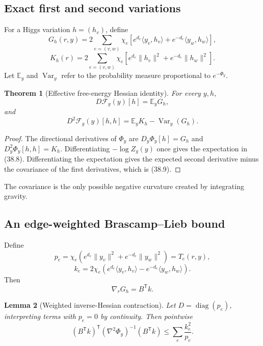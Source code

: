 \documentclass[11pt]{article}
\newtheorem{theorem}{Theorem}[section]
\newtheorem{lemma}[theorem]{Lemma}
\theoremstyle{remark}
\begin{document}
\subsection{Exact first and second variations}

For a Higgs variation \(h=(h_v)\), define
\[
 G_h(r,y)=2\sum_{e=(v,w)}\chi_e\left[
 e^{d_e}\langle y_v,h_v\rangle
 +e^{-d_e}\langle y_w,h_w\rangle
 \right],                                         \tag{38.6}
\]
\[
 K_h(r)=2\sum_{e=(v,w)}\chi_e\left[
 e^{d_e}\|h_v\|^2+e^{-d_e}\|h_w\|^2
 \right].                                         \tag{38.7}
\]
Let \(\mathbb E_y\) and \(\operatorname{Var}_y\) refer to the
probability measure proportional to \(e^{-\Phi_y}\).

\begin{theorem}[Effective free-energy Hessian identity]
\label{thm:v17v38-hessian}
For every \(y,h\),
\[
 D\mathcal F_g(y)[h]=\mathbb E_yG_h,               \tag{38.8}
\]
and
\[
 \boxed{
 D^2\mathcal F_g(y)[h,h]
 =\mathbb E_yK_h-\operatorname{Var}_y(G_h).}       \tag{38.9}
\]
\end{theorem}

\begin{proof}
The directional derivatives of \(\Phi_y\) are
\(D_y\Phi_y[h]=G_h\) and
\(D_y^2\Phi_y[h,h]=K_h\).  Differentiating
\(-\log Z_g(y)\) once gives the expectation in (38.8).
Differentiating the expectation gives the expected second derivative
minus the covariance of the first derivatives, which is (38.9).
\end{proof}

The covariance is the only possible negative curvature created by
integrating gravity.

\subsection{An edge-weighted Brascamp--Lieb bound}

Define
\[
 p_e=\chi_e\left(
 e^{d_e}\|y_v\|^2+e^{-d_e}\|y_w\|^2
 \right)=T_e(r,y),                                \tag{38.10}
\]
\[
 k_e=2\chi_e\left(
 e^{d_e}\langle y_v,h_v\rangle
 -e^{-d_e}\langle y_w,h_w\rangle
 \right).                                         \tag{38.11}
\]
Then
\[
 \nabla_rG_h=B^{\mathsf T}k.                      \tag{38.12}
\]

\begin{lemma}[Weighted inverse-Hessian contraction]
\label{lem:v17v38-weighted}
Let \(D=\operatorname{diag}(p_e)\), interpreting terms with
\(p_e=0\) by continuity.  Then pointwise
\[
 (B^{\mathsf T}k)^{\mathsf T}
 (\nabla^2\Phi_y)^{-1}(B^{\mathsf T}k)
 \leq\sum_e\frac{k_e^2}{p_e}.                     \tag{38.13}
\]
\end{lemma}
\end{document}

